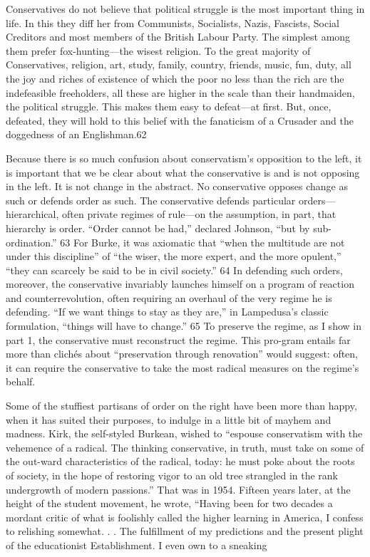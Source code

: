  \par 
Conservatives do not believe that political struggle is the most important thing in life. In this they diff her from Communists, Socialists, Nazis, Fascists, Social Creditors and most members of the British Labour Party. The simplest among them prefer fox-hunting—the wisest religion. To the great majority of Conservatives, religion, art, study, family, country, friends, music, fun, duty, all the joy and riches of existence of which the poor no less than the rich are the indefeasible freeholders, all these are higher in the scale than their handmaiden, the political struggle. This makes them easy to defeat—at first. But, once, defeated, they will hold to this belief with the fanaticism of a Crusader and the doggedness of an Englishman.{\color{blue}62}
 \par 
Because there is so much confusion about conservatism’s opposition to the left, it is important that we be clear about what the conservative is and is not opposing in the left. It is not change in the abstract. No conservative opposes change as such or defends order as such. The conservative defends particular orders—hierarchical, often private regimes of rule—on the assumption, in part, that hierarchy is order. “Order cannot be had,” declared Johnson, “but by sub-ordination.” {\color{blue}63} For Burke, it was axiomatic that “when the multitude are not under this discipline” of “the wiser, the more expert, and the more opulent,” “they can scarcely be said to be in civil society.” {\color{blue}64} In defending such orders, moreover, the conservative invariably launches himself on a program of reaction and counterrevolution, often requiring an overhaul of the very regime he is defending. “If we want things to stay as they are,” in Lampedusa’s classic formulation, “things will have to change.” {\color{blue}65} To preserve the regime, as I show in part 1, the conservative must reconstruct the regime. This pro-gram entails far more than clichés about “preservation through renovation” would suggest: often, it can require the conservative to take the most radical measures on the regime’s behalf.
 \par 
Some of the stuffiest partisans of order on the right have been more than happy, when it has suited their purposes, to indulge in a little bit of mayhem and madness. Kirk, the self-styled Burkean, wished to “espouse conservatism with the vehemence of a radical. The thinking conservative, in truth, must take on some of the out-ward characteristics of the radical, today: he must poke about the roots of society, in the hope of restoring vigor to an old tree strangled in the rank undergrowth of modern passions.” That was in 1954. Fifteen years later, at the height of the student movement, he wrote, “Having been for two decades a mordant critic of what is foolishly called the higher learning in America, I confess to relishing somewhat. . . The fulfillment of my predictions and the present plight of the educationist Establishment. I even own to a sneaking
